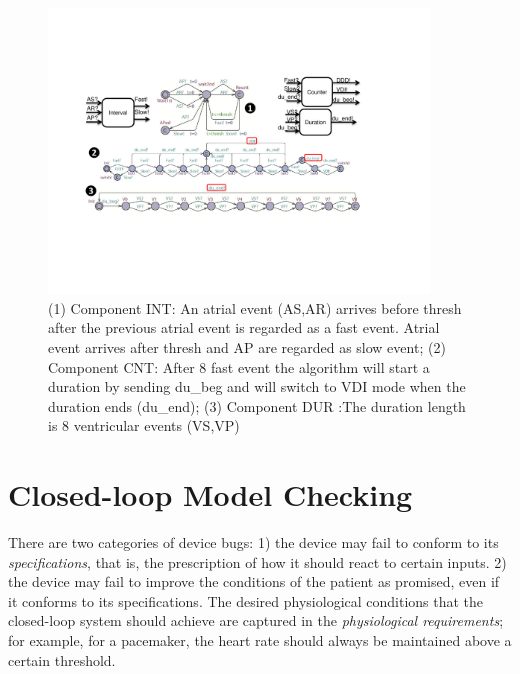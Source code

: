\begin{figure}
		\centering
		\includegraphics[width=0.9\textwidth]{figs/duration.pdf}
		\vspace{-10pt}
		\caption{\small (1) Component \textsf{INT}: An atrial event (\textsf{AS,AR}) arrives before \textsf{thresh} after the previous atrial event is regarded as a \textsf{fast} event. Atrial event arrives after \textsf{thresh} and \textsf{AP} are regarded as \textsf{slow} event; (2) Component \textsf{CNT}: After 8 \textsf{fast} event the algorithm will start a duration by sending \textsf{du\_beg} and will switch to \textsf{VDI} mode when the duration ends (\textsf{du\_end}); (3) Component \textsf{DUR} :The duration length is 8 ventricular events (\textsf{VS,VP})}
		\label{fig:dur_count}
\end{figure} 


\chapter{Closed-loop Model Checking}
There are two categories of device bugs: 
1) the device may fail to conform to its \emph{specifications}, that is, the prescription of how it should react to certain inputs.  
2) the device may fail to improve the conditions of the patient as promised, even if it conforms to its specifications. 
The desired physiological conditions that the closed-loop system should achieve are captured in the \emph{physiological requirements}; for example, for a pacemaker, the heart rate should always be maintained above a certain threshold. 

